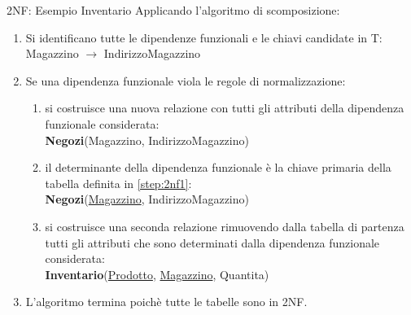 \begin{frame}{2NF: Esempio Inventario}
Applicando l'algoritmo di scomposizione:
{\scriptsize \begin{minipage}{0.8\textwidth}
    \begin{enumerate}[<+->]
        \item Si identificano tutte le dipendenze funzionali e le chiavi candidate in T:
        \\Magazzino $ \rightarrow $ IndirizzoMagazzino
        \item Se una dipendenza funzionale viola le regole di normalizzazione:\label{step:2nf}
        \begin{minipage}{0.8\textwidth}
        \begin{enumerate}[a]
            \item si costruisce una nuova relazione con tutti gli attributi della dipendenza funzionale considerata\label{step:2nf1}:
            \\\textbf{Negozi}(Magazzino, IndirizzoMagazzino)
            \item il determinante della dipendenza funzionale \`e la chiave primaria della tabella definita in \ref{step:2nf1}:
            \\\textbf{Negozi}(\underline{Magazzino}, IndirizzoMagazzino)
            \item si costruisce una seconda relazione rimuovendo dalla tabella di partenza tutti gli attributi che sono determinati dalla dipendenza funzionale considerata:
            \\\textbf{Inventario}(\underline{Prodotto}, \underline{Magazzino}, Quantita)
        \end{enumerate}
        \end{minipage}
        \item L'algoritmo termina poich\`e tutte le tabelle sono in 2NF.
    \end{enumerate}
\end{minipage}}
\end{frame}
